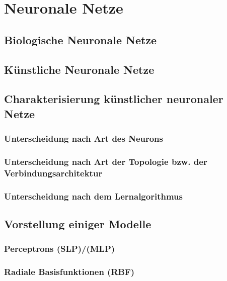 

\section{Neuronale Netze}

\subsection{Biologische Neuronale Netze}

\subsection{Künstliche Neuronale Netze}\label{sec:einf_neuro}

\subsection{Charakterisierung künstlicher neuronaler Netze}\label{sec:char}

\subsubsection{Unterscheidung nach Art des Neurons}

\subsubsection{Unterscheidung nach Art der Topologie bzw. der Verbindungsarchitektur}

\subsubsection{Unterscheidung nach dem Lernalgorithmus }

\subsection{Vorstellung einiger Modelle}\label{sec:ANN-Modelle}

\subsubsection{Perceptrons (SLP)/(MLP)}

\subsubsection{Radiale Basisfunktionen (RBF)}

